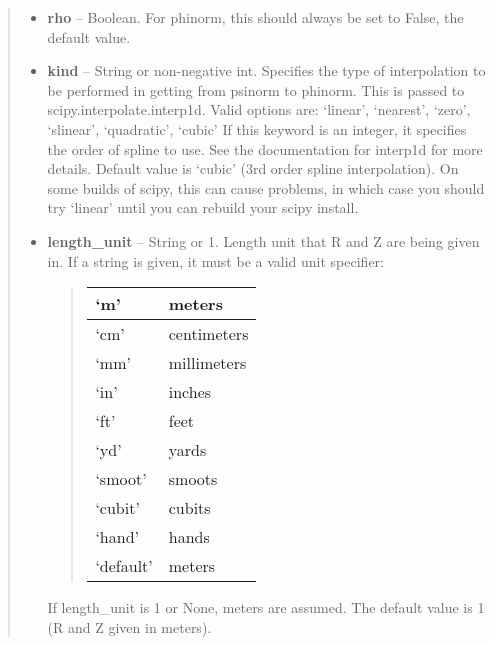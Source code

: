 \documentclass[letterpaper,10pt,english]{sphinxmanual}
\begin{document}
\begin{fulllineitems}
\begin{fulllineitems}
\begin{quote}
\begin{description}
\begin{itemize}
\item {} 
\textbf{rho} --
Boolean.
For phinorm, this should always be set to False, the
default value.

\item {} 
\textbf{kind} --
String or non-negative int.
Specifies the type of interpolation
to be performed in getting from psinorm to phinorm. This is
passed to scipy.interpolate.interp1d. Valid options are:
`linear', `nearest', `zero', `slinear', `quadratic', `cubic'
If this keyword is an integer, it specifies the order of spline
to use. See the documentation for interp1d for more details.
Default value is `cubic' (3rd order spline interpolation). On
some builds of scipy, this can cause problems, in which case
you should try `linear' until you can rebuild your scipy install.

\item {} 
\textbf{length\_unit} --
String or 1.
Length unit that R and Z are being given
in. If a string is given, it must be a valid unit specifier:
\begin{quote}

\begin{tabulary}{\linewidth}{|L|L|}
\hline

`m'
 & 
meters
\\\hline

`cm'
 & 
centimeters
\\\hline

`mm'
 & 
millimeters
\\\hline

`in'
 & 
inches
\\\hline

`ft'
 & 
feet
\\\hline

`yd'
 & 
yards
\\\hline

`smoot'
 & 
smoots
\\\hline

`cubit'
 & 
cubits
\\\hline

`hand'
 & 
hands
\\\hline

`default'
 & 
meters
\\\hline
\end{tabulary}

\end{quote}

If length\_unit is 1 or None, meters are assumed. The default
value is 1 (R and Z given in meters).


\end{itemize}
\end{description}
\end{quote}
\end{fulllineitems}
\end{fulllineitems}
\end{document}
